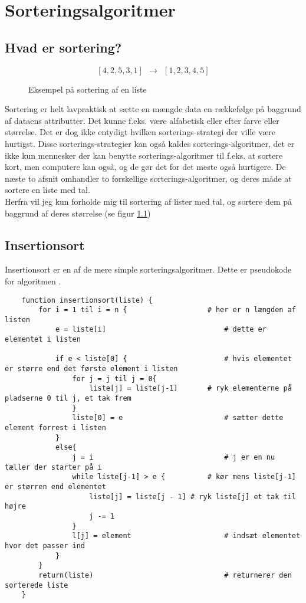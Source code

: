 \chapter{Sorteringsalgoritmer}
\label{ch:Sorteringsalgoritmer}

\section{Hvad er sortering?}
\label{sec:Hvad er sortering?}

\begin{figure}
	\begin{center}
		$$[4,2,5,3,1] \:\:\longrightarrow\:\: [1,2,3,4,5]$$
	\end{center}
	\caption{Eksempel på sortering af en liste}
	\label{fig:Eksempel på sortering af en liste}
\end{figure}


Sortering er helt lavpraktisk at sætte en mængde data en rækkefølge på baggrund af dataens attributter. Det kunne f.eks. være alfabetisk eller efter farve eller størrelse. Det er dog ikke entydigt hvilken sorterings-strategi der ville være hurtigst. Disse sorterings-strategier kan også kaldes sorterings-algoritmer, det er ikke kun mennesker der kan benytte sorterings-algoritmer til f.eks. at sortere kort, men computere kan også, og de gør det for det meste også hurtigere. De næste to afsnit omhandler to forskellige sorterings-algoritmer, og deres måde at sortere en liste med tal.\\


Herfra vil jeg kun forholde mig til sortering af lister med tal, og sortere dem på baggrund af deres størrelse (se figur \ref{fig:Eksempel på sortering af en liste})


\section{Insertionsort}
\label{sec:Insertionsort}

Insertionsort er en af de mere simple sorteringsalgoritmer. Dette er pseudokode for algoritmen \cite[s. 104]{aogd}.

\begin{lstlisting}
	function insertionsort(liste) {
		for i = 1 til i = n {					# her er n længden af listen
			e = liste[i]	 						# dette er elementet i listen

			if e < liste[0] {						# hvis elementet er større end det første element i listen
				for j = j til j = 0{ 
					liste[j] = liste[j-1]		# ryk elementerne på pladserne 0 til j, et tak frem
				}
				liste[0] = e 						# sætter dette element forrest i listen
			}
			else{
				j = i 								# j er en nu tæller der starter på i
				while liste[j-1] > e {			# kør mens liste[j-1] er størren end elementet
					liste[j] = liste[j - 1] # ryk liste[j] et tak til højre
					j -= 1
				}
				l[j] = element						# indsæt elementet hvor det passer ind
			}
		}			
		return(liste)								# returnerer den sorterede liste
	}
	
\end{lstlisting}


